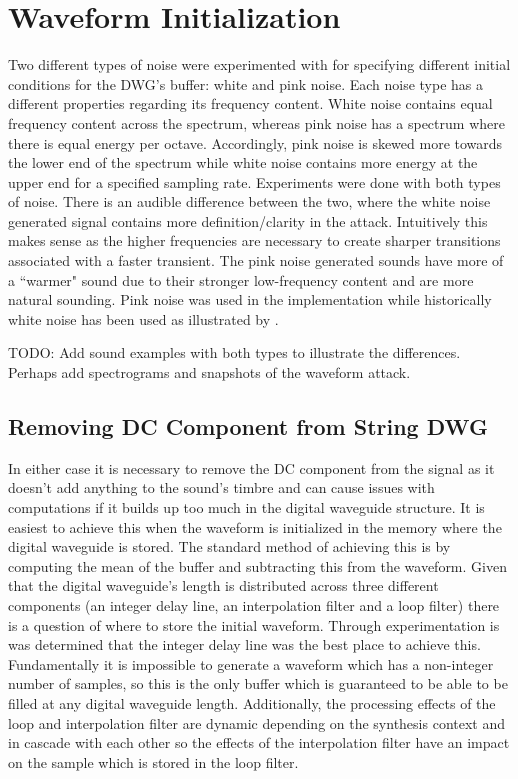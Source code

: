 \documentclass[../main.tex]{subfiles}
\begin{document}
\section{Waveform Initialization}
Two different types of noise were experimented with for specifying different initial conditions for the DWG's buffer: white and pink noise. Each noise type has a different properties regarding its frequency content. White noise contains equal frequency content across the spectrum, whereas pink noise has a spectrum where there is equal energy per octave. Accordingly, pink noise is skewed more towards the lower end of the spectrum while white noise contains more energy at the upper end for a specified sampling rate. Experiments were done with both types of noise. There is an audible difference between the two, where the white noise generated signal contains more definition/clarity in the attack. Intuitively this makes sense as the higher frequencies are necessary to create sharper transitions associated with a faster transient. The pink noise generated sounds have more of a ``warmer" sound due to their stronger low-frequency content and are more natural sounding. Pink noise was used in the  implementation while historically white noise has been used as illustrated by . 

TODO: Add sound examples with both types to illustrate the differences. Perhaps add spectrograms and snapshots of the waveform attack.

\subsection{Removing DC Component from String DWG}
In either case it is necessary to remove the DC component from the signal as it doesn't add anything to the sound's timbre and can cause issues with computations if it builds up too much in the digital waveguide structure. It is easiest to achieve this when the waveform is initialized in the memory where the digital waveguide is stored. The standard method of achieving this is by computing the mean of the buffer and subtracting this from the waveform. Given that the digital waveguide's length is distributed across three different components (an integer delay line, an interpolation filter and a loop filter) there is a question of where to store the initial waveform. Through experimentation is was determined that the integer delay line was the best place to achieve this. Fundamentally it is impossible to generate a waveform which has a non-integer number of samples, so this is the only buffer which is guaranteed to be able to be filled at any digital waveguide length. Additionally, the processing effects of the loop and interpolation filter are dynamic depending on the synthesis context and in cascade with each other so the effects of the interpolation filter have an impact on the sample which is stored in the loop filter.
\end{document}
